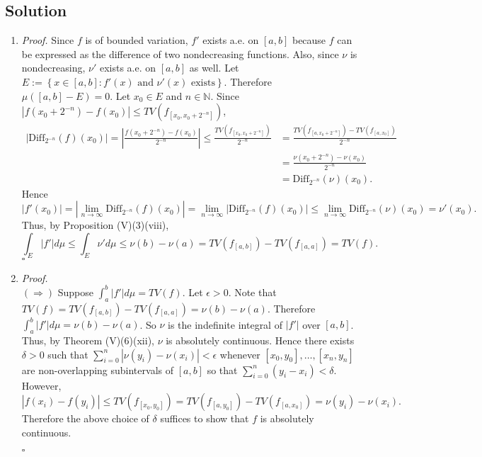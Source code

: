 \documentclass[12pt]{article}
\newcounter{ProofCounter}
\newenvironment{Proof}{\stepcounter{ProofCounter}\textit{Proof.}}{\hfill$\square$}
\begin{document}
\subsection*{Solution}
\begin{enumerate}[label=(\roman*)]
\item 
\begin{Proof}
Since $f$ is of bounded variation, $f'$ exists a.e. on $[a,b]$ because $f$ can be expressed as the difference of two nondecreasing functions. Also,
since $\nu$ is nondecreasing, $\nu'$ exists a.e. on $[a,b]$ as well. Let $E := \left\{ x \in [a,b] : f'(x) \text{ and } \nu'(x) \text{ exists}
\right\}$. Therefore $\mu([a,b] - E) = 0$. Let $x_{0} \in E$ and $n \in \mathbb{N}$. Since $|f(x_{0} + 2^{-n}) - f(x_{0})| \leq TV(f_{[x_{0}, x_0 +
2^{-n}]})$,
\begin{align*}
|\text{Diff}_{2^{-n}}(f)(x_{0})| = \left| \frac{f(x_{0} + 2^{-n}) - f(x_{0})}{2^{-n}}\right| \leq \frac{TV(f_{[x_{0},x_{0} + 2^{-n}]})}{2^{-n}} & =
\frac{TV(f_{[a,x_{0}+2^{-n}]}) - TV(f_{[a,x_0]})}{2^{-n}} \\
& = \frac{\nu(x_{0} + 2^{-n}) - \nu(x_{0})}{2^{-n}} \\
& = \text{Diff}_{2^{-n}}(\nu)(x_{0}).
\end{align*}
Hence
\[ |f'(x_{0})| = |\lim_{n\rightarrow\infty}\text{Diff}_{2^{-n}}(f)(x_{0})| = \lim_{n\rightarrow\infty}|\text{Diff}_{2^{-n}}(f)(x_{0})| \leq
\lim_{n\rightarrow\infty}\text{Diff}_{2^{-n}}(\nu)(x_{0}) = \nu'(x_{0}). \]
Thus, by Proposition (V)(3)(viii),
\[ \int_{E}|f'|d\mu \leq \int_{E}\nu'd\mu \leq \nu(b) - \nu(a) = TV(f_{[a,b]}) - TV(f_{[a,a]}) = TV(f). \]
\end{Proof}

\item 
\begin{Proof} \\
$(\Rightarrow)$ Suppose $\int_{a}^{b}|f'|d\mu = TV(f)$. Let $\epsilon > 0$. Note that $TV(f) = TV(f_{[a,b]}) - TV(f_{[a,a]}) = \nu(b) - \nu(a)$.
Therefore $\int_{a}^{b}|f'|d\mu = \nu(b) - \nu(a)$. So $\nu$ is the indefinite integral of $|f'|$ over $[a,b]$. Thus, by Theorem (V)(6)(xii), $\nu$ is
absolutely continuous. Hence there exists $\delta > 0$ such that $\sum_{i=0}^{n}|\nu(y_{i}) - \nu(x_{i})| < \epsilon$ whenever $[x_{0},y_{0}], \hdots,
[x_{n}, y_{n}]$ are non-overlapping subintervals of $[a,b]$ so that $\sum_{i=0}^{n}(y_{i} - x_{i}) < \delta$. However, 
\[ |f(x_{i}) - f(y_{i})| \leq TV(f_{[x_{0},y_{0}]}) = TV(f_{[a,y_{0}]}) - TV(f_{[a,x_{0}]}) = \nu(y_{i}) - \nu(x_{i}). \]
Therefore the above choice of $\delta$ suffices to show that $f$ is absolutely continuous.


\end{Proof}
\end{enumerate}
\end{document}
